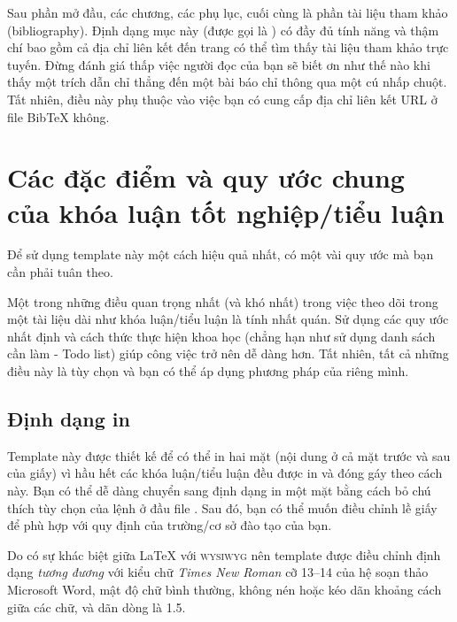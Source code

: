 Sau phần mở đầu, các chương, các phụ lục, cuối cùng là phần tài liệu tham khảo (bibliography). Định dạng mục này (được gọi là ) có đầy đủ tính năng và thậm chí bao gồm cả địa chỉ liên kết đến trang có thể tìm thấy tài liệu tham khảo trực tuyến. Đừng đánh giá thấp việc người đọc của bạn sẽ biết ơn như thế nào khi thấy một trích dẫn chỉ thẳng đến một bài báo chỉ thông qua một cú nhấp chuột. Tất nhiên, điều này phụ thuộc vào việc bạn có cung cấp địa chỉ liên kết URL ở file BibTeX không.



\section{Các đặc điểm và quy ước chung của khóa luận tốt nghiệp/tiểu luận}\label{ThesisConventions}

Để sử dụng template này một cách hiệu quả nhất, có một vài quy ước mà bạn cần phải tuân theo.

Một trong những điều quan trọng nhất (và khó nhất) trong việc theo dõi trong một tài liệu dài như khóa luận/tiểu luận là tính nhất quán. Sử dụng các quy ước nhất định và cách thức thực hiện khoa học (chẳng hạn như sử dụng danh sách cần làm - Todo list) giúp công việc trở nên dễ dàng hơn. Tất nhiên, tất cả những điều này là tùy chọn và bạn có thể áp dụng phương pháp của riêng mình.


\subsection{Định dạng in}

Template này được thiết kế để có thể in hai mặt (nội dung ở cả mặt trước và sau của giấy) vì hầu hết các khóa luận/tiểu luận đều được in và đóng gáy theo cách này. Bạn có thể dễ dàng chuyển sang định dạng in một mặt bằng cách bỏ chú thích tùy chọn  của lệnh  ở đầu file . Sau đó, bạn có thể muốn điều chỉnh lề giấy để phù hợp với quy định của trường/cơ sở đào tạo của bạn.

Do có sự khác biệt giữa \LaTeX{} với \textsc{wysiwyg} nên template được điều chỉnh định dạng \emph{tương đương} với kiểu chữ \textit{Times New Roman} cỡ 13--14 của hệ soạn thảo Microsoft Word, mật độ chữ bình thường, không nén hoặc kéo dãn khoảng cách giữa các chữ, và dãn dòng là 1.5.



